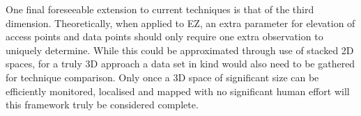 \documentclass{UoYCSproject}
\begin{document}
        One final foreseeable extension to current techniques is that of the third dimension. Theoretically, when applied to EZ, an extra parameter for elevation of access points and data points should only require one extra observation to uniquely determine. While this could be approximated through use of stacked 2D spaces, for a truly 3D approach a data set in kind would also need to be gathered for technique comparison. Only once a 3D space of significant size can be efficiently monitored, localised and mapped with no significant human effort will this framework truly be considered complete.
        
    
	
\end{document}
